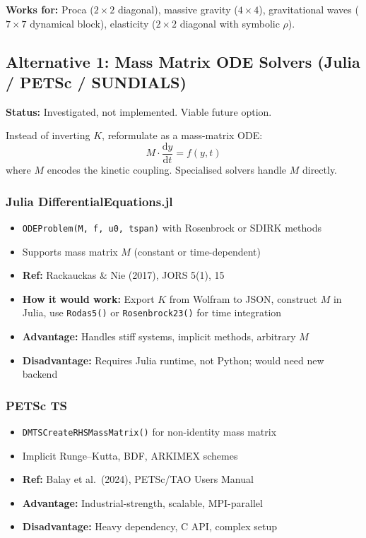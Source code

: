 \textbf{Works for:} Proca ($2\times 2$ diagonal), massive gravity ($4\times 4$), gravitational waves ($7\times 7$ dynamical block), elasticity ($2\times 2$ diagonal with symbolic $\rho$).


\subsection{Alternative 1: Mass Matrix ODE Solvers (Julia / PETSc / SUNDIALS)}
\label{sec:kinetic-alt1}

\textbf{Status:} Investigated, not implemented. Viable future option.

Instead of inverting $K$, reformulate as a mass-matrix ODE:
\begin{equation}
  M \cdot \frac{\mathrm{d}y}{\mathrm{d}t} = f(y, t)
  \label{eq:mass-matrix-ode}
\end{equation}
where $M$ encodes the kinetic coupling. Specialised solvers handle $M$ directly.

\subsubsection{Julia DifferentialEquations.jl}
\label{sec:kinetic-julia}

\begin{itemize}
  \item \texttt{ODEProblem(M, f, u0, tspan)} with Rosenbrock or SDIRK methods
  \item Supports mass matrix $M$ (constant or time-dependent)
  \item \textbf{Ref:} Rackauckas \& Nie (2017), JORS 5(1), 15
  \item \textbf{How it would work:} Export $K$ from Wolfram to JSON, construct $M$ in Julia, use \texttt{Rodas5()} or \texttt{Rosenbrock23()} for time integration
  \item \textbf{Advantage:} Handles stiff systems, implicit methods, arbitrary $M$
  \item \textbf{Disadvantage:} Requires Julia runtime, not Python; would need new backend
\end{itemize}

\subsubsection{PETSc TS}
\label{sec:kinetic-petsc}

\begin{itemize}
  \item \texttt{DMTSCreateRHSMassMatrix()} for non-identity mass matrix
  \item Implicit Runge--Kutta, BDF, ARKIMEX schemes
  \item \textbf{Ref:} Balay et al.\ (2024), PETSc/TAO Users Manual
  \item \textbf{Advantage:} Industrial-strength, scalable, MPI-parallel
  \item \textbf{Disadvantage:} Heavy dependency, C API, complex setup
\end{itemize}

